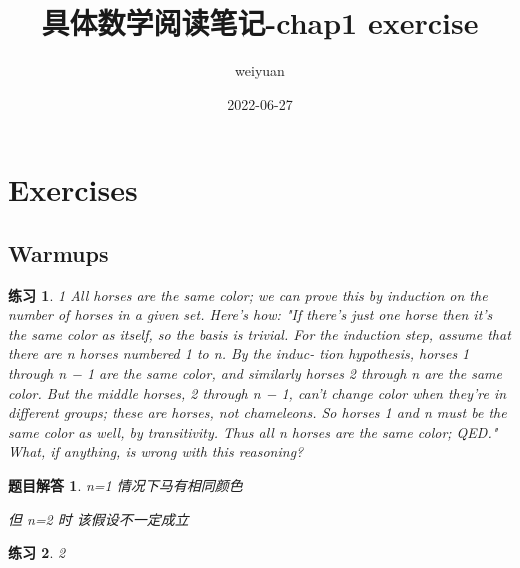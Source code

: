 \documentclass[mode=geye]{elegantnote}
\title{具体数学阅读笔记-chap1 exercise}
\author{weiyuan}
\date{2022-06-27}
\newtheorem{exercise}{练习}
\newtheorem{answer}{题目解答}
\begin{document}
\maketitle

\section{Exercises}
\subsection{Warmups}

\begin{exercise}1
	All horses are the same color; we can prove this by induction on the
	number of horses in a given set. Here's how: "If there's just one horse
	then it's the same color as itself, so the basis is trivial. For the induction
	step, assume that there are n horses numbered 1 to n. By the induc-
	tion hypothesis, horses 1 through n − 1 are the same color, and similarly
	horses 2 through n are the same color. But the middle horses, 2 through
	n − 1, can't change color when they're in different groups; these are
	horses, not chameleons. So horses 1 and n must be the same color as
	well, by transitivity. Thus all n horses are the same color; QED." What,
	if anything, is wrong with this reasoning?
\end{exercise}

\begin{answer}
	n=1 情况下马有相同颜色
	
	但 n=2 时	该假设不一定成立
\end{answer}


\begin{exercise}2
\end{exercise}
\end{document}
